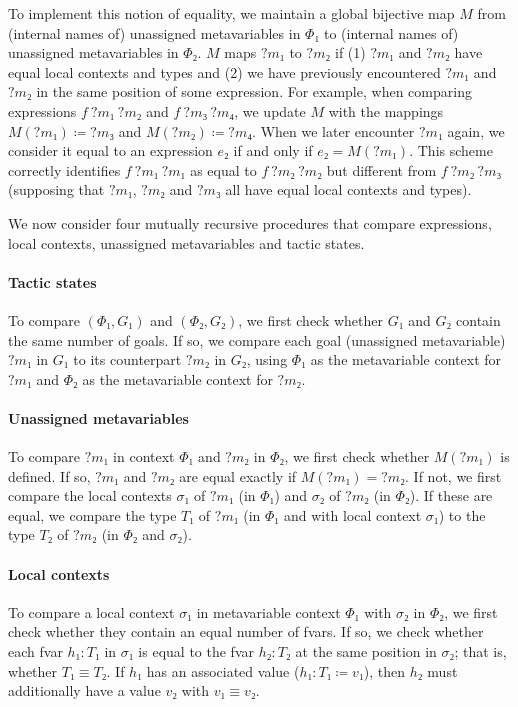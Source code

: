 \documentclass[sigplan,10pt,anonymous,review]{acmart}
\newcommand{\mvar}[1]{{?#1}}
\begin{document}
To implement this notion of equality, we maintain a global bijective map $M$ from (internal names of) unassigned metavariables in $Φ₁$ to (internal names of) unassigned metavariables in $Φ₂$.
$M$ maps $\mvar{m₁}$ to $\mvar{m₂}$ if (1) $\mvar{m₁}$ and $\mvar{m₂}$ have equal local contexts and types and (2) we have previously encountered $\mvar{m₁}$ and $\mvar{m₂}$ in the same position of some expression.
For example, when comparing expressions $f~\mvar{m₁}~\mvar{m₂}$ and $f~\mvar{m₃}~\mvar{m₄}$, we update $M$ with the mappings $M(\mvar{m₁}) ≔ \mvar{m₃}$ and $M(\mvar{m₂}) ≔ \mvar{m₄}$.
When we later encounter $\mvar{m₁}$ again, we consider it equal to an expression $e₂$ if and only if $e₂ = M(\mvar{m₁})$.
This scheme correctly identifies $f~\mvar{m₁}~\mvar{m₁}$ as equal to $f~\mvar{m₂}~\mvar{m₂}$ but different from $f~\mvar{m₂}~\mvar{m₃}$ (supposing that $\mvar{m₁}$, $\mvar{m₂}$ and $\mvar{m₃}$ all have equal local contexts and types).

We now consider four mutually recursive procedures that compare expressions, local contexts, unassigned metavariables and tactic states.

\paragraph{Tactic states} To compare $(Φ₁, G₁)$ and $(Φ₂, G₂)$, we first check whether $G₁$ and $G₂$ contain the same number of goals.
If so, we compare each goal (unassigned metavariable) $\mvar{m₁}$ in $G₁$ to its counterpart $\mvar{m₂}$ in $G₂$, using $Φ₁$ as the metavariable context for $\mvar{m₁}$ and $Φ₂$ as the metavariable context for $\mvar{m₂}$.

\paragraph{Unassigned metavariables} To compare $\mvar{m₁}$ in context $Φ₁$ and $\mvar{m₂}$ in $Φ₂$, we first check whether $M(\mvar{m₁})$ is defined.
If so, $\mvar{m₁}$ and $\mvar{m₂}$ are equal exactly if $M(\mvar{m₁}) = \mvar{m₂}$.
If not, we first compare the local contexts $σ₁$ of $\mvar{m₁}$ (in $Φ₁$) and $σ₂$ of $\mvar{m₂}$ (in $Φ₂$).
If these are equal, we compare the type $T₁$ of $\mvar{m₁}$ (in $Φ₁$ and with local context $σ₁$) to the type $T₂$ of $\mvar{m₂}$ (in $Φ₂$ and $σ₂$).

\paragraph{Local contexts} To compare a local context $σ₁$ in metavariable context $Φ₁$ with $σ₂$ in $Φ₂$, we first check whether they contain an equal number of fvars.
If so, we check whether each fvar $h₁ : T₁$ in $σ₁$ is equal to the fvar $h₂ : T₂$ at the same position in $σ₂$; that is, whether $T₁ ≡ T₂$.
If $h₁$ has an associated value ($h₁ : T₁ ≔ v₁$), then $h₂$ must additionally have a value $v₂$ with $v₁ ≡ v₂$.
\end{document}
